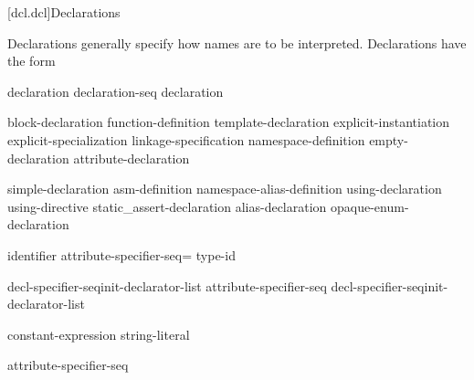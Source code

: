 [dcl.dcl]{Declarations}%



\pnum
Declarations generally specify how names are to be interpreted. Declarations have
the form

\begin{bnf}
\br
    declaration\br
    declaration-seq declaration
\end{bnf}

\begin{bnf}
\br
    block-declaration\br
    function-definition\br
    template-declaration\br
    explicit-instantiation\br
    explicit-specialization\br
    linkage-specification\br
    namespace-definition\br
    empty-declaration\br
    attribute-declaration
\end{bnf}

\begin{bnf}
\br
    simple-declaration\br
    asm-definition\br
    namespace-alias-definition\br
    using-declaration\br
    using-directive\br
    static_assert-declaration\br
    alias-declaration\br
    opaque-enum-declaration
\end{bnf}

\begin{bnf}
\br
     identifier attribute-specifier-seq\opt = type-id \terminal{;}
\end{bnf}

\begin{bnf}
\br
    decl-specifier-seq\opt init-declarator-list\opt \terminal{;}\br
    attribute-specifier-seq decl-specifier-seq\opt init-declarator-list \terminal{;}
\end{bnf}

\begin{bnf}
\br
   \terminal{(} constant-expression \terminal{,} string-literal \terminal{)} \terminal{;}
\end{bnf}

\begin{bnf}
\br
    \terminal{;}
\end{bnf}

\begin{bnf}
\br
    attribute-specifier-seq \terminal{;}
\end{bnf}

